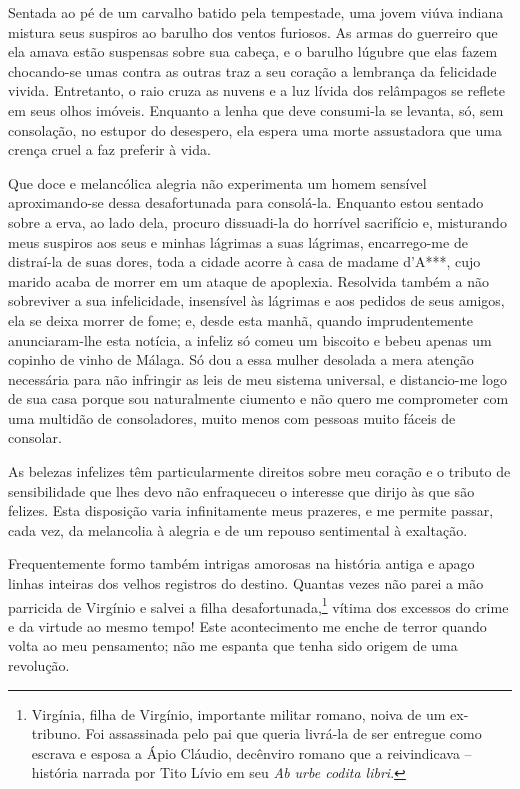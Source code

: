  Sentada ao pé de um carvalho batido pela tempestade, uma jovem viúva
indiana mistura seus suspiros ao barulho dos ventos furiosos. As armas
do guerreiro que ela amava estão suspensas sobre sua cabeça, e o
barulho lúgubre que elas fazem chocando-se umas contra as outras traz a
seu coração a lembrança da felicidade vivida. Entretanto, o raio cruza
as nuvens e a luz lívida dos relâmpagos se reflete em seus olhos
imóveis.  Enquanto a lenha que deve consumi-la se levanta, só, sem
consolação, no estupor do desespero, ela espera uma morte assustadora
que uma crença cruel a faz preferir à vida. 

 Que doce e melancólica alegria não experimenta um homem sensível
aproximando-se dessa desafortunada para consolá-la. Enquanto estou
sentado sobre a erva, ao lado dela, procuro dissuadi-la do horrível
sacrifício e, misturando meus suspiros aos seus e minhas lágrimas a
suas lágrimas, encarrego-me de distraí-la de suas dores, toda a cidade
acorre à casa de madame d’A***, cujo marido acaba de morrer em um
ataque de apoplexia. Resolvida também a não sobreviver a sua
infelicidade, insensível às lágrimas e aos pedidos de seus amigos, ela
se deixa morrer de fome; e, desde esta manhã, quando imprudentemente
anunciaram-lhe esta notícia, a infeliz só comeu um biscoito e bebeu
apenas um copinho de vinho de Málaga. Só dou a essa mulher desolada a
mera atenção necessária para não infringir as leis de meu sistema
universal, e distancio-me logo de sua casa porque sou naturalmente
ciumento e não quero me comprometer com uma multidão de consoladores,
muito menos com pessoas muito fáceis de consolar.

 As belezas infelizes têm particularmente direitos sobre meu coração e o
tributo de sensibilidade que lhes devo não enfraqueceu o interesse que
dirijo às que são felizes. Esta disposição varia infinitamente meus
prazeres, e me permite passar, cada vez, da melancolia à alegria e de
um repouso sentimental à exaltação.

 Frequentemente formo também intrigas amorosas na história antiga e
apago linhas inteiras dos velhos registros do destino. Quantas vezes
não parei a mão parricida de Virgínio e salvei a filha
desafortunada,\footnote{ Virgínia, filha de Virgínio, importante militar
romano, noiva de um ex-tribuno. Foi assassinada pelo pai que queria
livrá-la de ser entregue como escrava e esposa a Ápio Cláudio,
decênviro romano que a reivindicava -- história narrada por Tito Lívio
em seu \textit{Ab urbe codita libri}.} vítima dos excessos do
crime e da virtude ao mesmo tempo! Este acontecimento me enche de
terror quando volta ao meu pensamento; não me espanta que tenha sido
origem de uma revolução. 

